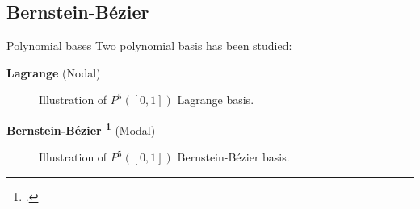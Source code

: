 \subsection{Bernstein-Bézier}
 \begin{frame}{Polynomial bases}
 \scriptsize
 Two polynomial basis has been studied:
 \begin{multicols}{2}
 \textbf{Lagrange} (Nodal)

\vspace{0.5cm}
\begin{figure}[H]
\centering
\setlength{\plotwidth}{3.5cm}
\setlength{\plotheight}{2.5cm}

\caption{\scriptsize{Illustration of $P^5([0,1])$ Lagrange basis.}}
\label{lagrange_5}
\end{figure}

\columnbreak
\textbf{Bernstein-Bézier \footcite{chanGPUacceleratedBernsteinBezierDiscontinuous2016}} (Modal)

\begin{figure}[H]
\centering
\setlength{\plotwidth}{3.5cm}
\setlength{\plotheight}{2.5cm}

\caption{\scriptsize{Illustration of $P^5([0,1])$ Bernstein-Bézier basis.}}
\label{bb_base_5}
\end{figure}

\end{multicols}

\end{frame}


